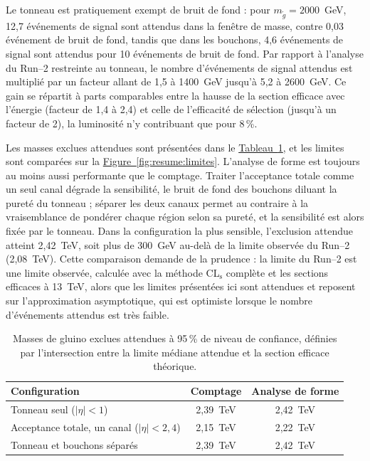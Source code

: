 Le tonneau est pratiquement exempt de bruit de fond : pour $m_{\tilde{g}}=2000$~GeV, 12,7 événements de signal sont attendus dans la fenêtre de masse, contre 0,03 événement de bruit de fond, tandis que dans les bouchons, 4,6 événements de signal sont attendus pour 10 événements de bruit de fond. Par rapport à l'analyse du Run--2 restreinte au tonneau, le nombre d'événements de signal attendus est multiplié par un facteur allant de 1,5 à 1400~GeV jusqu'à 5,2 à 2600~GeV. Ce gain se répartit à parts comparables entre la hausse de la section efficace avec l'énergie (facteur de 1,4 à 2,4) et celle de l'efficacité de sélection (jusqu'à un facteur de 2), la luminosité n'y contribuant que pour 8\,\%.

Les masses exclues attendues sont présentées dans le \hyperref[tab:resume:limites]{Tableau~\ref*{tab:resume:limites}}, et les limites sont comparées sur la \hyperref[fig:resume:limites]{Figure~\ref*{fig:resume:limites}}. L'analyse de forme est toujours au moins aussi performante que le comptage. Traiter l'acceptance totale comme un seul canal dégrade la sensibilité, le bruit de fond des bouchons diluant la pureté du tonneau ; séparer les deux canaux permet au contraire à la vraisemblance de pondérer chaque région selon sa pureté, et la sensibilité est alors fixée par le tonneau. Dans la configuration la plus sensible, l'exclusion attendue atteint 2,42~TeV, soit plus de 300~GeV au-delà de la limite observée du Run--2 (2,08~TeV). Cette comparaison demande de la prudence : la limite du Run--2 est une limite observée, calculée avec la méthode CL$_\mathrm{s}$ complète et les sections efficaces à 13~TeV, alors que les limites présentées ici sont attendues et reposent sur l'approximation asymptotique, qui est optimiste lorsque le nombre d'événements attendus est très faible.

\vspace{0.5 cm}

\begin{table}[h!]
    \centering
    \small
    \renewcommand{\arraystretch}{1.3}
    \begin{tabular}{lcc}
        \toprule
        Configuration & Comptage & Analyse de forme \\
        \midrule
        Tonneau seul ($|\eta|<1$) & 2,39~TeV & 2,42~TeV \\
        Acceptance totale, un canal ($|\eta|<2{,}4$) & 2,15~TeV & 2,22~TeV \\
        Tonneau et bouchons séparés & 2,39~TeV & 2,42~TeV \\
        \bottomrule
    \end{tabular}
    \caption{Masses de gluino exclues attendues à 95\,\% de niveau de confiance, définies par l'intersection entre la limite médiane attendue et la section efficace théorique.}
    \label{tab:resume:limites}
\end{table}

